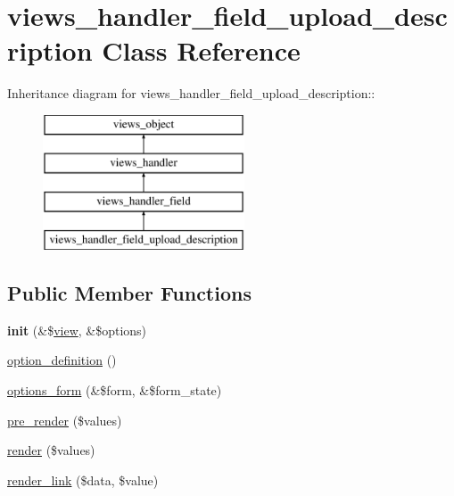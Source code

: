 \hypertarget{classviews__handler__field__upload__description}{
\section{views\_\-handler\_\-field\_\-upload\_\-description Class Reference}
\label{classviews__handler__field__upload__description}
}
Inheritance diagram for views\_\-handler\_\-field\_\-upload\_\-description::\begin{figure}[H]
\begin{center}
\leavevmode
\includegraphics[height=4cm]{classviews__handler__field__upload__description}
\end{center}
\end{figure}
\subsection*{Public Member Functions}
\begin{CompactItemize}
\item 
\hypertarget{classviews__handler__field__upload__description_21f106935e4fb58cd34205af53f7aa8c}{
\textbf{init} (\&\$\hyperlink{classview}{view}, \&\$options)}
\label{classviews__handler__field__upload__description_21f106935e4fb58cd34205af53f7aa8c}

\item 
\hyperlink{classviews__handler__field__upload__description_506091a767dacc29b687de0f0802933b}{option\_\-definition} ()
\item 
\hyperlink{classviews__handler__field__upload__description_714cc6455e6fa7c9426dcf08dee9f89e}{options\_\-form} (\&\$form, \&\$form\_\-state)
\item 
\hyperlink{classviews__handler__field__upload__description_0890ab0770ad73dc186283a2222d473c}{pre\_\-render} (\$values)
\item 
\hyperlink{classviews__handler__field__upload__description_373489ebca619b9f73ebfd3441a1cd19}{render} (\$values)
\item 
\hyperlink{classviews__handler__field__upload__description_2abc8e79bc269c87dda32ad9f70f7ae4}{render\_\-link} (\$data, \$value)
\end{CompactItemize}


